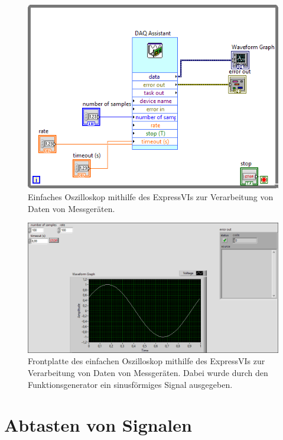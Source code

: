 \documentclass[
a4paper,
12pt,
pagesize,
ngerman
]{scrartcl}
\begin{document}
	\begin{figure}[H]  
		\includegraphics[width=1\textwidth]{EIRE2018Dateien/Tag2/expressVI_1d}
		\centering
		\caption{
			Einfaches Oszilloskop mithilfe des ExpressVIs zur Verarbeitung von Daten von Messgeräten.
		}
		\label{fig_tag2_oszi_express_block}
		\centering
	\end{figure}
	\begin{figure}[H]  
		\includegraphics[width=1\textwidth]{EIRE2018Dateien/Tag2/expressVI_1p}
		\centering
		\caption{
			Frontplatte des einfachen Oszilloskop mithilfe des ExpressVIs zur Verarbeitung von Daten von Messgeräten. Dabei wurde durch den Funktionsgenerator ein sinusförmiges Signal ausgegeben.
		}
		\label{fig_tag2_oszi_express_front}
	\centering
	\end{figure}
	
	
	\section{Abtasten von Signalen}
	
\end{document}
